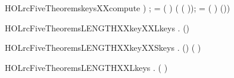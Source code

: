 \begin{SaveVerbatim}{HOLrcFiveTheoremskeysXXcompute}
                    ) ;
         = ( \HOLSymConst{\ensuremath{+}} )  ( \HOLSymConst{\HOLTokenProd{}} ( \HOLSymConst{\ensuremath{+}} ));
         = ( \HOLSymConst{\ensuremath{+}} )  
        (\HOLSymConst{,}\HOLSymConst{,}\HOLSymConst{,}\HOLSymConst{,}\HOLSymConst{,}))
\end{SaveVerbatim}
\newcommand{\HOLrcFiveTheoremskeysXXcompute}{\UseVerbatim{HOLrcFiveTheoremskeysXXcompute}}
\begin{SaveVerbatim}{HOLrcFiveTheoremsLENGTHXXkeyXXLkeys}
\HOLTokenTurnstile{} \HOLSymConst{\HOLTokenForall{}}  . (\HOLSymConst{,}\HOLSymConst{,}\HOLSymConst{,}\HOLSymConst{,}\HOLSymConst{,}) \HOLSymConst{=}     \HOLSymConst{\HOLTokenImp{}}   \HOLSymConst{=} 
\end{SaveVerbatim}
\newcommand{\HOLrcFiveTheoremsLENGTHXXkeyXXLkeys}{\UseVerbatim{HOLrcFiveTheoremsLENGTHXXkeyXXLkeys}}
\begin{SaveVerbatim}{HOLrcFiveTheoremsLENGTHXXkeyXXSkeys}
\HOLTokenTurnstile{} \HOLSymConst{\HOLTokenForall{}}  .
     (\HOLSymConst{,}\HOLSymConst{,}\HOLSymConst{,}\HOLSymConst{,}\HOLSymConst{,}) \HOLSymConst{=}     \HOLSymConst{\HOLTokenImp{}}   \HOLSymConst{=}  \HOLSymConst{\HOLTokenProd{}} ( \HOLSymConst{\ensuremath{+}} )
\end{SaveVerbatim}
\newcommand{\HOLrcFiveTheoremsLENGTHXXkeyXXSkeys}{\UseVerbatim{HOLrcFiveTheoremsLENGTHXXkeyXXSkeys}}
\begin{SaveVerbatim}{HOLrcFiveTheoremsLENGTHXXLkeys}
\HOLTokenTurnstile{} \HOLSymConst{\HOLTokenForall{}}.  ( ) \HOLSymConst{=} 
\end{SaveVerbatim}
\newcommand{\HOLrcFiveTheoremsLENGTHXXLkeys}{\UseVerbatim{HOLrcFiveTheoremsLENGTHXXLkeys}}
